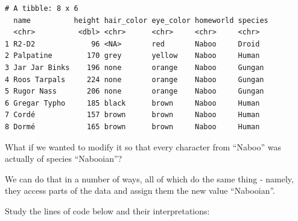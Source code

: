 \documentclass[]{book}
\newenvironment{Shaded}{\begin{snugshade}}{\end{snugshade}}
\newcommand{\CommentTok}[1]{\textcolor[rgb]{0.56,0.35,0.01}{\textit{#1}}}
\newcommand{\DecValTok}[1]{\textcolor[rgb]{0.00,0.00,0.81}{#1}}
\newcommand{\NormalTok}[1]{#1}
\newcommand{\OperatorTok}[1]{\textcolor[rgb]{0.81,0.36,0.00}{\textbf{#1}}}
\newcommand{\StringTok}[1]{\textcolor[rgb]{0.31,0.60,0.02}{#1}}
\begin{document}
\begin{verbatim}
# A tibble: 8 x 6
  name          height hair_color eye_color homeworld species
  <chr>          <dbl> <chr>      <chr>     <chr>     <chr>  
1 R2-D2             96 <NA>       red       Naboo     Droid  
2 Palpatine        170 grey       yellow    Naboo     Human  
3 Jar Jar Binks    196 none       orange    Naboo     Gungan 
4 Roos Tarpals     224 none       orange    Naboo     Gungan 
5 Rugor Nass       206 none       orange    Naboo     Gungan 
6 Gregar Typho     185 black      brown     Naboo     Human  
7 Cordé            157 brown      brown     Naboo     Human  
8 Dormé            165 brown      brown     Naboo     Human  
\end{verbatim}

What if we wanted to modify it so that every character from ``Naboo'' was actually of species ``Nabooian''?

We can do that in a number of ways, all of which do the same thing - namely, they access parts of the data and assign them the new value ``Nabooian''.

Study the lines of code below and their interpretations:

\begin{Shaded}
\end{Shaded}
\end{document}
